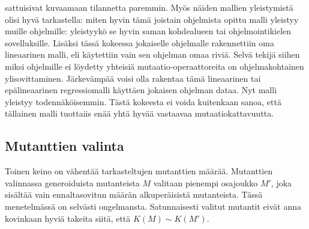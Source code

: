 \documentclass{tktltiki}
\begin{document}
sattuisivat kuvaamaan tilannetta paremmin. Myös näiden mallien yleistymistä olisi hyvä tarkastella: miten hyvin tämä joistain ohjelmista opittu malli yleistyy muille ohjelmille: yleistyykö se hyvin saman kohdealueen tai ohjelmointikielen sovelluksille. Lisäksi tässä kokeessa jokaiselle ohjelmalle rakennettiin oma lineaarinen malli, eli käytettiin vain sen ohjelman omaa riviä. Selvä tekijä siihen miksi ohjelmille ei löydetty yhteisiä mutaatio-operaattoreita on ohjelmakohtainen ylisovittaminen. Järkevämpää voisi olla rakentaa tämä lineaarinen tai epälineaarinen regressiomalli käyttäen jokaisen ohjelman dataa. Nyt malli yleistyy todennäköisemmin. Tästä kokeesta ei voida kuitenkaan sanoa, että tällainen malli tuottaiis enää yhtä hyvää vastaavaa mutaatiokattavuutta.

\subsection{Mutanttien valinta}
Toinen keino on vähentää tarkasteltujen mutanttien määrää. Mutanttien valinnassa generoiduista mutanteista $M$ valitaan pienempi osajoukko $M'$, joka sisältää vain ennaltasovitun määrän alkuperäisistä mutanteista. Tässä menetelmässä on selvästi ongelmansta. Satunnaisesti valitut mutantit eivät anna kovinkaan hyviä takeita siitä, että $K(M) \sim K(M')$. 
\end{document}
